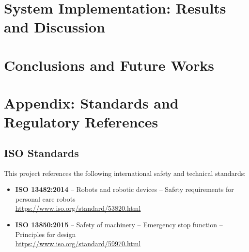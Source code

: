 \documentclass[11pt,a4paper]{article}
\begin{document}
\section{System Implementation: Results and Discussion}
\label{sec:implementation}


\section{Conclusions and Future Works}
\label{sec:conclusion}


\newpage



\newpage
\appendix
\section{Appendix: Standards and Regulatory References}
\label{sec:appendix}

\subsection{ISO Standards}
This project references the following international safety and technical standards:

\begin{itemize}[leftmargin=*]
    \item \textbf{ISO 13482:2014} -- Robots and robotic devices -- Safety requirements for personal care robots \\
    \url{https://www.iso.org/standard/53820.html}
    
    
    \item \textbf{ISO 13850:2015} -- Safety of machinery -- Emergency stop function -- Principles for design \\
    \url{https://www.iso.org/standard/59970.html}
\end{itemize}
\end{document}
